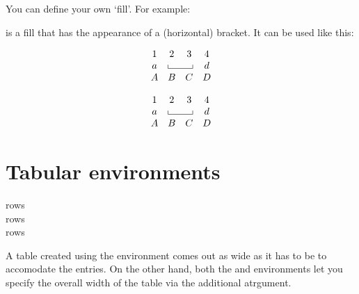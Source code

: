     You can define your own `fill'. For example:
\begin{lcode}
\newcommand*{\upbracketfill}{%
  \vrule height 4pt depth 0pt\hrulefill%
  \vrule height 4pt depth 0pt}
\end{lcode}
is a fill that has the appearance of a (horizontal) bracket. It can
be used like this:
\begin{lcode}
\begin{displaymath}
\begin{array}{cccc}
1 & 2 & 3 & 4 \\
a & \multicolumn{2}{c}{\upbracketfill} & d \\
A & B & C & D
\end{array}
\end{displaymath}
\end{lcode}

\newcommand*{\upbracketfill}{%
  \vrule height 4pt depth 0pt\hrulefill\vrule height 4pt depth 0pt}

\begin{displaymath}
\begin{array}{cccc}
1 & 2 & 3 & 4 \\
a & \multicolumn{2}{c}{\upbracketfill} & d \\
A & B & C & D
\end{array}
\end{displaymath}


\section{Tabular environments}


\begin{syntax}
 rows  \\
 rows  \\
 rows  \\
\end{syntax}

    A table created using the  environment comes out as
wide as it has to be to accomodate the entries. On the other hand,
both the  and  environments let you specify
the overall width 
of the table via the additional  atrgument.

